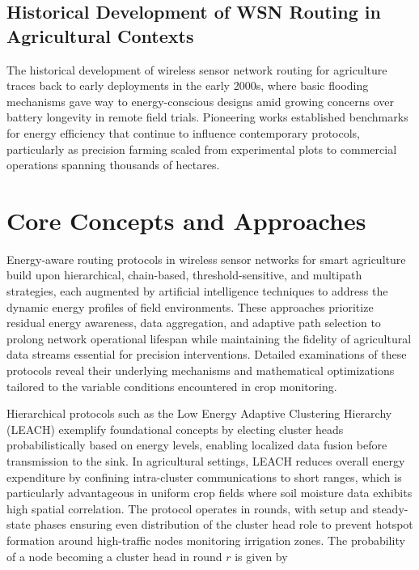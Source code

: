 \documentclass[12pt]{article}
\begin{document}
\subsection{Historical Development of WSN Routing in Agricultural Contexts}

The historical development of wireless sensor network routing for agriculture traces back to early deployments in the early 2000s, where basic flooding mechanisms gave way to energy-conscious designs amid growing concerns over battery longevity in remote field trials. Pioneering works established benchmarks for energy efficiency that continue to influence contemporary protocols, particularly as precision farming scaled from experimental plots to commercial operations spanning thousands of hectares.

\section{Core Concepts and Approaches}

Energy-aware routing protocols in wireless sensor networks for smart agriculture build upon hierarchical, chain-based, threshold-sensitive, and multipath strategies, each augmented by artificial intelligence techniques to address the dynamic energy profiles of field environments. These approaches prioritize residual energy awareness, data aggregation, and adaptive path selection to prolong network operational lifespan while maintaining the fidelity of agricultural data streams essential for precision interventions. Detailed examinations of these protocols reveal their underlying mechanisms and mathematical optimizations tailored to the variable conditions encountered in crop monitoring.

Hierarchical protocols such as the Low Energy Adaptive Clustering Hierarchy (LEACH) exemplify foundational concepts by electing cluster heads probabilistically based on energy levels, enabling localized data fusion before transmission to the sink. In agricultural settings, LEACH reduces overall energy expenditure by confining intra-cluster communications to short ranges, which is particularly advantageous in uniform crop fields where soil moisture data exhibits high spatial correlation. The protocol operates in rounds, with setup and steady-state phases ensuring even distribution of the cluster head role to prevent hotspot formation around high-traffic nodes monitoring irrigation zones. The probability of a node becoming a cluster head in round \( r \) is given by
\end{document}

